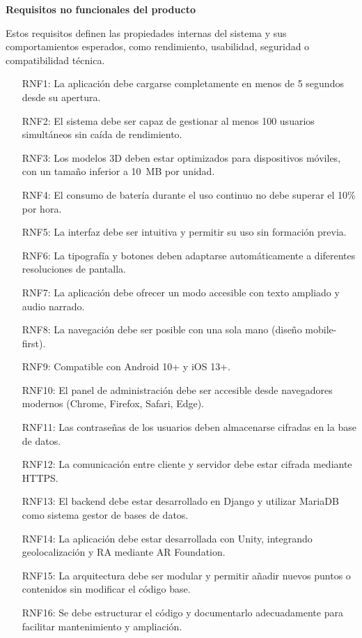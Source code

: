 \textbf{Requisitos no funcionales del producto}

Estos requisitos definen las propiedades internas del sistema y sus comportamientos esperados, como rendimiento, usabilidad, seguridad o compatibilidad técnica.

\begin{itemize}
    \item[RNF1:] La aplicación debe cargarse completamente en menos de 5 segundos desde su apertura.
    \item[RNF2:] El sistema debe ser capaz de gestionar al menos 100 usuarios simultáneos sin caída de rendimiento.
    \item[RNF3:] Los modelos 3D deben estar optimizados para dispositivos móviles, con un tamaño inferior a 10~MB por unidad.
    \item[RNF4:] El consumo de batería durante el uso continuo no debe superar el 10\% por hora.
    \item[RNF5:] La interfaz debe ser intuitiva y permitir su uso sin formación previa.
    \item[RNF6:] La tipografía y botones deben adaptarse automáticamente a diferentes resoluciones de pantalla.
    \item[RNF7:] La aplicación debe ofrecer un modo accesible con texto ampliado y audio narrado.
    \item[RNF8:] La navegación debe ser posible con una sola mano (diseño mobile-first).
    \item[RNF9:] Compatible con Android 10+ y iOS 13+.
    \item[RNF10:] El panel de administración debe ser accesible desde navegadores modernos (Chrome, Firefox, Safari, Edge).
    \item[RNF11:] Las contraseñas de los usuarios deben almacenarse cifradas en la base de datos.
    \item[RNF12:] La comunicación entre cliente y servidor debe estar cifrada mediante HTTPS.
    \item[RNF13:] El backend debe estar desarrollado en Django y utilizar MariaDB como sistema gestor de bases de datos.
    \item[RNF14:] La aplicación debe estar desarrollada con Unity, integrando geolocalización y RA mediante AR Foundation.
    \item[RNF15:] La arquitectura debe ser modular y permitir añadir nuevos puntos o contenidos sin modificar el código base.
    \item[RNF16:] Se debe estructurar el código y documentarlo adecuadamente para facilitar mantenimiento y ampliación.
\end{itemize}

